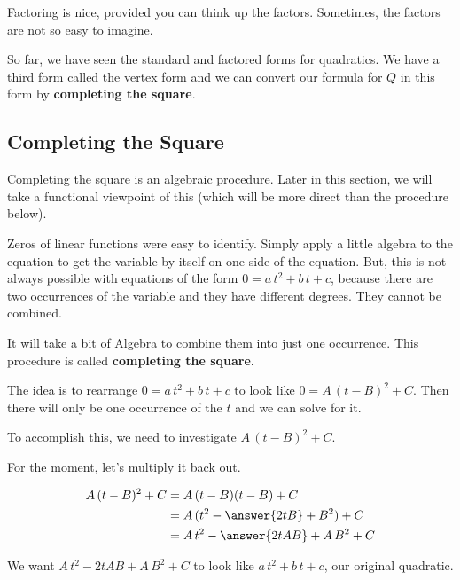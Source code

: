\documentclass{ximera}
\begin{document}
Factoring is nice, provided you can think up the factors.  Sometimes, the factors are not so easy to imagine. 


So far, we have seen the standard and factored forms for quadratics. We have a third form called the vertex form and we can convert our formula for $Q$ in this form by \textbf{completing the square}.





\subsection*{Completing the Square}

Completing the square is an algebraic procedure.  Later in this section, we will take a functional viewpoint of this (which will be more direct than the procedure below). 



Zeros of linear functions were easy to identify.  Simply apply a little algebra to the equation to get the variable by itself on one side of the equation.  But, this is not always possible with equations of the form $0 = a \, t^2 + b \, t + c $, because there are two occurrences of the variable and they have different degrees. They cannot be combined.


It will take a bit of Algebra to combine them into just one occurrence. This procedure is called \textbf{completing the square}. 



\begin{idea}


The idea is to rearrange  $0 = a \, t^2 + b \, t + c$ to look like $0 = A \, (t-B)^2 + C$.  Then there will only be  one occurrence of the $t$ and we can solve for it.


To accomplish this, we need to investigate $A \, (t-B)^2 + C$. 

For the moment, let's multiply it back out.


\begin{align*}
A \, (t-B)^2 + C & = A \, (t-B)(t-B) + C \\
& = A \, (t^2 - \answer{2 t B} + B^2) + C  \\
& = A \, t^2 - \answer{2 t A B} + A \, B^2 + C
\end{align*}

We want $A \, t^2 - 2 t A B + A \, B^2 + C$ to look like $a \, t^2 + b \, t + c$, our original quadratic.

\end{idea}
\end{document}
